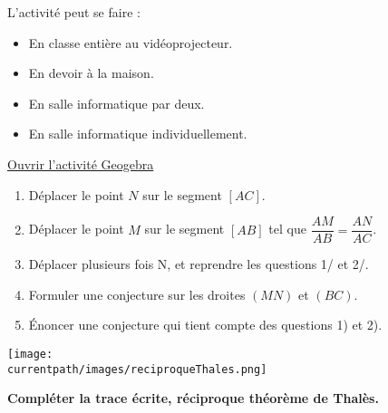 \begin{activite}
    
        \begin{remarque}
            L'activité peut se faire :
            \begin{itemize}
                \item En classe entière au vidéoprojecteur.
                \item En devoir à la maison.
                \item En salle informatique par deux.
                \item En salle informatique individuellement.
            \end{itemize}
        \end{remarque}
        
        \href{https://www.geogebra.org/m/nztvwr9b}{ Ouvrir l'activité Geogebra}

        \begin{enumerate}
            \item Déplacer le point $N$ sur le segment $[AC]$.
            \item Déplacer le point $M$ sur le segment $[AB]$ tel que $\dfrac{AM}{AB}=\dfrac{AN}{AC}$.
            \item Déplacer plusieurs fois N, et reprendre les questions 1/ et 2/.
            \item Formuler une conjecture sur les droites $(MN)$ et $(BC)$.
            \item Énoncer une conjecture qui tient compte des questions 1) et 2).
        \end{enumerate}

        \begin{center}
            \texttt{[image: \\currentpath/images/reciproqueThales.png]}
        \end{center}

        \textbf{Compléter la trace écrite, réciproque théorème de Thalès.}
\end{activite}